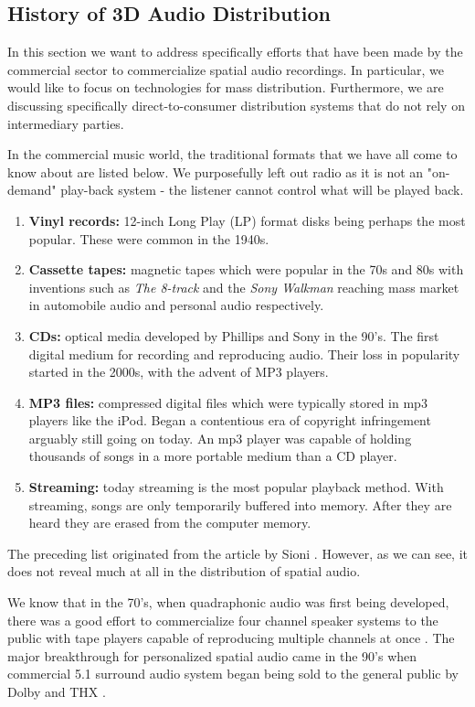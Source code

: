 \subsection{History of 3D Audio Distribution}

In this section we want to address specifically efforts that have been made by the commercial sector to commercialize spatial audio recordings. In particular, we would like to focus on technologies for mass distribution. Furthermore, we are discussing specifically direct-to-consumer distribution systems that do not rely on intermediary parties. 

In the commercial music world, the traditional formats that we have all come to know about are listed below. We purposefully left out radio as it is not an "on-demand" play-back system - the listener cannot control what will be played back.

\begin{enumerate}
    \item \textbf{Vinyl records:} 12-inch Long Play (LP) format disks being perhaps the most popular. These were common in the 1940s. 
    \item \textbf{Cassette tapes:} magnetic tapes which were popular in the 70s and 80s with inventions such as \textit{The 8-track} and the \textit{Sony Walkman} reaching mass market in automobile audio and personal audio respectively.
    \item \textbf{CDs:} optical media developed by Phillips and Sony in the 90's. The first digital medium for recording and reproducing audio. Their loss in popularity started in the 2000s, with the advent of MP3 players.
    \item \textbf{MP3 files:} compressed digital files which were typically stored in mp3 players like the iPod. Began a contentious era of copyright infringement arguably still going on today. An mp3 player was capable of holding thousands of songs in a more portable medium than a CD player. 
    \item \textbf{Streaming:} today streaming is the most popular playback method. With streaming, songs are only temporarily buffered into memory. After they are heard they are erased from the computer memory.
\end{enumerate}

The preceding list originated from the article by Sioni \cite{ABriefHi41online}. However, as we can see, it does not reveal much at all in the distribution of spatial audio. 

We know that in the 70's, when quadraphonic audio was first being developed, there was a good effort to commercialize four channel speaker systems to the public with tape players capable of reproducing multiple channels at once \cite{postrel1990competing}. The major breakthrough for personalized spatial audio came in the 90's when commercial 5.1 surround audio system began being sold to the general public by Dolby and THX \cite{manolas2009enlarging}.

